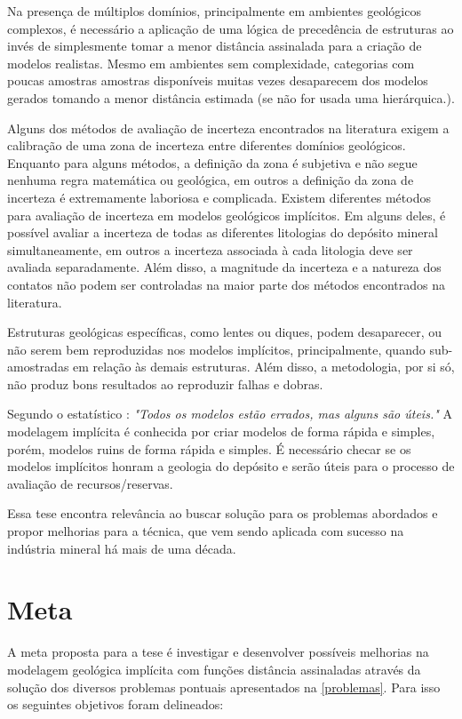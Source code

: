 Na presença de múltiplos domínios, principalmente em ambientes geológicos complexos, é necessário a aplicação de uma lógica de precedência de estruturas ao invés de simplesmente tomar a menor distância assinalada para a criação de modelos realistas. Mesmo em ambientes sem complexidade, categorias com poucas amostras amostras disponíveis muitas vezes desaparecem dos modelos gerados tomando a menor distância estimada (se não for usada uma hierárquica.).

Alguns dos métodos de avaliação de incerteza encontrados na literatura exigem a calibração de uma zona de incerteza entre diferentes domínios geológicos. Enquanto para alguns métodos, a definição da zona é subjetiva e não segue nenhuma regra matemática ou geológica, em outros a definição da zona de incerteza é extremamente laboriosa e complicada.
Existem diferentes métodos para avaliação de incerteza em modelos geológicos implícitos. Em alguns deles, é possível avaliar a incerteza de todas as diferentes litologias do depósito mineral simultaneamente, em outros a incerteza associada à cada litologia deve ser avaliada separadamente. Além disso, a magnitude da incerteza e a natureza dos contatos não podem ser controladas na maior parte dos métodos encontrados na literatura.

Estruturas geológicas específicas, como lentes ou diques, podem desaparecer, ou não serem bem reproduzidas nos modelos implícitos, principalmente, quando sub-amostradas em relação às demais estruturas. Além disso, a metodologia, por si só, não produz bons resultados ao reproduzir falhas e dobras. 

Segundo o estatístico : \textit{"Todos os modelos estão errados, mas alguns são úteis."} A modelagem implícita é conhecida por criar modelos de forma rápida e simples, porém, modelos ruins de forma rápida e simples. É necessário checar se os modelos implícitos honram a geologia do depósito e serão úteis para o processo de avaliação de recursos/reservas. 

Essa tese encontra relevância ao buscar solução para os problemas abordados e propor melhorias para a técnica, que vem sendo aplicada com sucesso na indústria mineral há mais de uma década.

\section{Meta}

A meta proposta para a tese é investigar e desenvolver possíveis melhorias na modelagem geológica implícita com funções distância assinaladas através da solução dos diversos problemas pontuais apresentados na \autoref{problemas}. Para isso os seguintes objetivos foram delineados:


